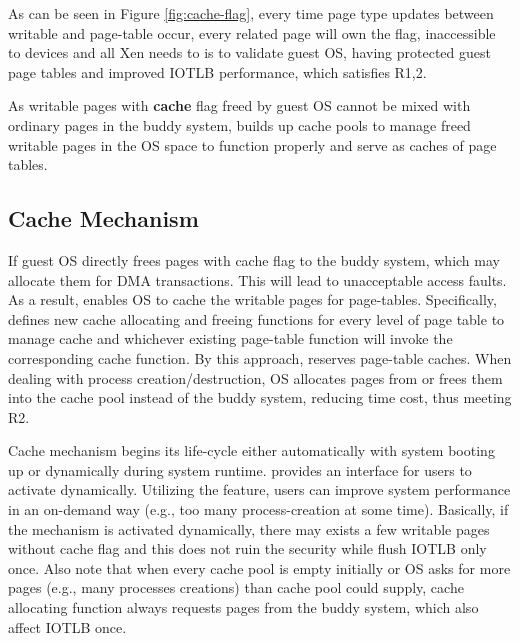 {As can be seen in Figure \ref{fig:cache-flag}, every time page type updates between writable and page-table occur, every related page will own the flag, inaccessible to devices and all Xen needs to is to validate guest OS, having protected guest page tables and improved IOTLB performance, which satisfies R1,2.

As writable pages with \textbf{cache} flag freed by guest OS cannot be mixed with ordinary pages in the buddy system, \name builds up cache pools to manage freed writable pages in the OS space to function properly and serve as caches of page tables.

\subsection{Cache Mechanism}
If guest OS directly frees pages with cache flag to the buddy system, which may allocate them for DMA transactions. This will lead to unacceptable access faults. As a result, \name enables OS to cache the writable pages for page-tables. Specifically, \name defines new cache allocating and freeing functions for every level of page table to manage cache and whichever existing page-table function will invoke the corresponding cache function. By this approach, \name reserves page-table caches. When dealing with process creation/destruction, OS allocates pages from or frees them into the cache pool instead of the buddy system, reducing time cost, thus meeting R2.

Cache mechanism begins its life-cycle either automatically with system booting up or dynamically during system runtime. \name provides an interface for users to activate dynamically. Utilizing the feature, users can improve system performance in an on-demand way (e.g., too many process-creation at some time). Basically, if the mechanism is activated dynamically, there may exists a few writable pages without cache flag and this does not ruin the security while flush IOTLB only once. Also note that when every cache pool is empty initially or OS asks for more pages (e.g., many processes creations) than cache pool could supply, cache allocating function always requests pages from the buddy system, which also affect IOTLB once.

}
